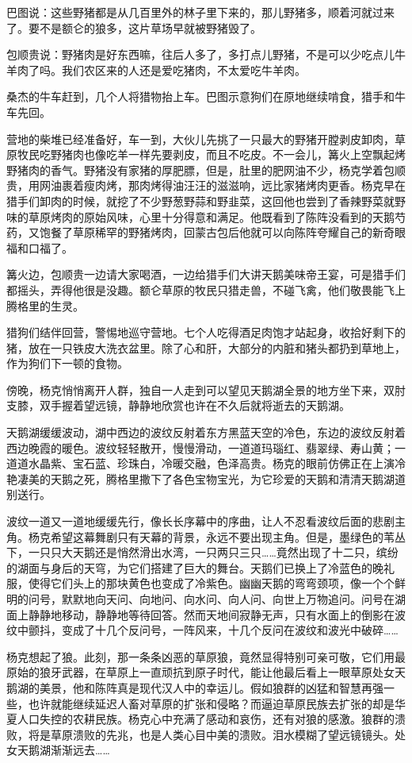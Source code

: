 \par 巴图说：这些野猪都是从几百里外的林子里下来的，那儿野猪多，顺着河就过来了。要不是额仑的狼多，这片草场早就被野猪毁了。
\par 包顺贵说：野猪肉是好东西嘛，往后人多了，多打点儿野猪，不是可以少吃点儿牛羊肉了吗。我们农区来的人还是爱吃猪肉，不太爱吃牛羊肉。
\par 桑杰的牛车赶到，几个人将猎物抬上车。巴图示意狗们在原地继续啃食，猎手和牛车先回。
\par 营地的柴堆已经准备好，车一到，大伙儿先挑了一只最大的野猪开膛剥皮卸肉，草原牧民吃野猪肉也像吃羊一样先要剥皮，而且不吃皮。不一会儿，篝火上空飘起烤野猪肉的香气。野猪没有家猪的厚肥膘，但是，肚里的肥网油不少，杨克学着包顺贵，用网油裹着瘦肉烤，那肉烤得油汪汪的滋滋响，远比家猪烤肉更香。杨克早在猎手们卸肉的时候，就挖了不少野葱野蒜和野韭菜，这回他也尝到了香辣野菜就野味的草原烤肉的原始风味，心里十分得意和满足。他既看到了陈阵没看到的天鹅芍药，又饱餐了草原稀罕的野猪烤肉，回蒙古包后他就可以向陈阵夸耀自己的新奇眼福和口福了。
\par 篝火边，包顺贵一边请大家喝酒，一边给猎手们大讲天鹅美味帝王宴，可是猎手们都摇头，弄得他很是没趣。额仑草原的牧民只猎走兽，不碰飞禽，他们敬畏能飞上腾格里的生灵。
\par 猎狗们结伴回营，警惕地巡守营地。七个人吃得酒足肉饱才站起身，收拾好剩下的猪，放在一只铁皮大洗衣盆里。除了心和肝，大部分的内脏和猪头都扔到草地上，作为狗们下一顿的食物。
\par 傍晚，杨克悄悄离开人群，独自一人走到可以望见天鹅湖全景的地方坐下来，双肘支膝，双手握着望远镜，静静地欣赏也许在不久后就将逝去的天鹅湖。
\par 天鹅湖缓缓波动，湖中西边的波纹反射着东方黑蓝天空的冷色，东边的波纹反射着西边晚霞的暖色。波纹轻轻散开，慢慢滑动，一道道玛瑙红、翡翠绿、寿山黄；一道道水晶紫、宝石蓝、珍珠白，冷暖交融，色泽高贵。杨克的眼前仿佛正在上演冷艳凄美的天鹅之死，腾格里撒下了各色宝物宝光，为它珍爱的天鹅和清清天鹅湖道别送行。
\par 波纹一道又一道地缓缓先行，像长长序幕中的序曲，让人不忍看波纹后面的悲剧主角。杨克希望这幕舞剧只有天幕的背景，永远不要出现主角。但是，墨绿色的苇丛下，一只只大天鹅还是悄然滑出水湾，一只两只三只……竟然出现了十二只，缤纷的湖面与身后的天穹，为它们搭建了巨大的舞台。天鹅们已换上了冷蓝色的晚礼服，使得它们头上的那块黄色也变成了冷紫色。幽幽天鹅的弯弯颈项，像一个个鲜明的问号，默默地向天问、向地问、向水问、向人问、向世上万物追问。问号在湖面上静静地移动，静静地等待回答。然而天地间寂静无声，只有水面上的倒影在波纹中颤抖，变成了十几个反问号，一阵风来，十几个反问在波纹和波光中破碎……
\par 杨克想起了狼。此刻，那一条条凶恶的草原狼，竟然显得特别可亲可敬，它们用最原始的狼牙武器，在草原上一直顽抗到原子时代，能让他最后看上一眼草原处女天鹅湖的美景，他和陈阵真是现代汉人中的幸运儿。假如狼群的凶猛和智慧再强一些，也许就能继续延迟人畜对草原的扩张和侵略？而逼迫草原民族去扩张的却是华夏人口失控的农耕民族。杨克心中充满了感动和哀伤，还有对狼的感激。狼群的溃败，将是草原溃败的先兆，也是人类心目中美的溃败。泪水模糊了望远镜镜头。处女天鹅湖渐渐远去……
